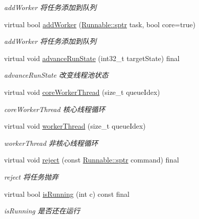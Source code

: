 \begin{DoxyCompactItemize}
\begin{DoxyCompactList}\small\item\em add\+Worker 将任务添加到队列 \end{DoxyCompactList}\item 
virtual bool \hyperlink{classThreadPoolExecutor_a9f108a305159ddf47923162f89a91a64}{add\+Worker} (\hyperlink{classRunnable_abe8d3066c7305401d6f0aad8e70780f2}{Runnable\+::sptr} task, bool core=true)
\begin{DoxyCompactList}\small\item\em add\+Worker 将任务添加到队列 \end{DoxyCompactList}\item 
virtual void \hyperlink{classThreadPoolExecutor_abaa3926310766a93b7fe1d83b77efdae}{advance\+Run\+State} (int32\+\_\+t target\+State) final
\begin{DoxyCompactList}\small\item\em advance\+Run\+State 改变线程池状态 \end{DoxyCompactList}\item 
virtual void \hyperlink{classThreadPoolExecutor_a5e40839bf4191b5eab9d81227ddb62c3}{core\+Worker\+Thread} (size\+\_\+t queue\+Idex)
\begin{DoxyCompactList}\small\item\em core\+Worker\+Thread 核心线程循环 \end{DoxyCompactList}\item 
virtual void \hyperlink{classThreadPoolExecutor_a844902ce61fb16b11a569b8ee56e80e9}{worker\+Thread} (size\+\_\+t queue\+Idex)
\begin{DoxyCompactList}\small\item\em worker\+Thread 非核心线程循环 \end{DoxyCompactList}\item 
virtual void \hyperlink{classThreadPoolExecutor_a353e65b77bb3c0950ed79939473d4852}{reject} (const \hyperlink{classRunnable_abe8d3066c7305401d6f0aad8e70780f2}{Runnable\+::sptr} command) final
\begin{DoxyCompactList}\small\item\em reject 将任务抛弃 \end{DoxyCompactList}\item 
virtual bool \hyperlink{classThreadPoolExecutor_a841ae2189d6f85b9df9f69dec5375341}{is\+Running} (int c) const final
\begin{DoxyCompactList}\small\item\em is\+Running 是否还在运行 \end{DoxyCompactList}\item 

\end{DoxyCompactItemize}
